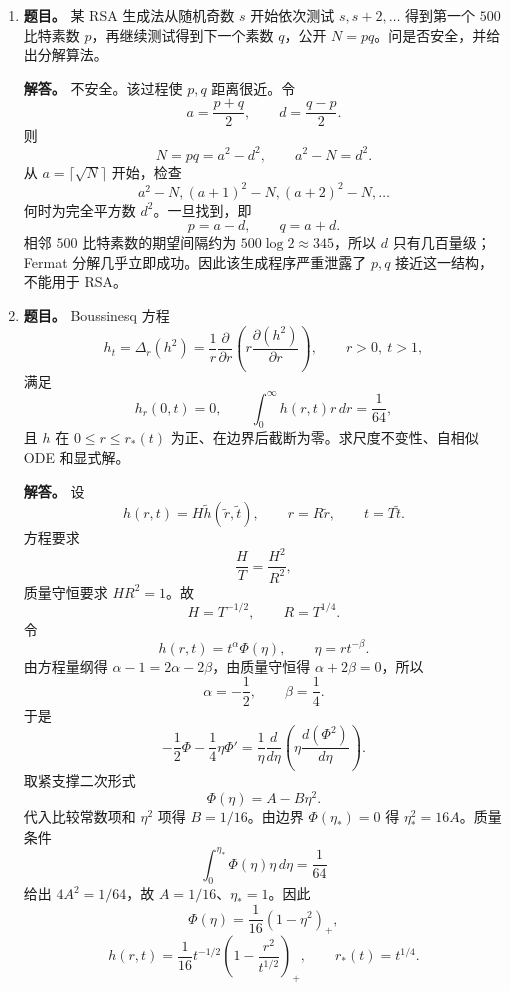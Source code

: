 ﻿\documentclass[UTF8,12pt]{ctexart}
\begin{document}
\begin{enumerate}[label=\textbf{\arabic*.},leftmargin=2.2em]
\textbf{解答。} 严格对角占优矩阵由 Levy--Desplanques 定理非奇异，故 \(Ax=b\) 有唯一解。若迭代收敛，则 \(\rho(M)<1\)，从而 \(|\det M|<1\)。由于 \(I+\alpha\Omega L\) 为单位下三角矩阵，
\[
|\det M|=\prod_{i=1}^N|1-\omega_i|,
\]
故必要条件为
\[
\prod_i|1-\omega_i|<1.
\]
设 \(\lambda\) 是 \(M\) 的特征值，取特征向量 \(x\) 中满足 \(|x_i|=\max_j|x_j|\) 的分量。由特征方程逐行估计得
\[
|\lambda|\bigl(1-|\alpha\omega_i|l_i\bigr)
\le |1-\omega_i|+|\omega_i|(|1-\alpha|l_i+u_i),
\]
其中
\[
l_i=\sum_{j<i}|a_{ij}|,\qquad u_i=\sum_{j>i}|a_{ij}|.
\]
若 \(|\alpha\omega_i|l_i<1\)，则
\[
|\lambda|\le
\frac{|1-\omega_i|+|\omega_i|(|1-\alpha|l_i+u_i)}
{1-|\alpha\omega_i|l_i}.
\]
对所有特征值取最大即得题中谱半径估计。若
\[
0<\omega_i<\frac{2}{1+l_i+u_i},
\]
并用严格对角占优给出的 \(l_i+u_i<1\)，可直接验证上式右端严格小于 \(1\)。故 \(\rho(M)<1\)，迭代收敛。

\item \textbf{题目。} 某 RSA 生成法从随机奇数 \(s\) 开始依次测试 \(s,s+2,\ldots\) 得到第一个 \(500\) 比特素数 \(p\)，再继续测试得到下一个素数 \(q\)，公开 \(N=pq\)。问是否安全，并给出分解算法。

\textbf{解答。} 不安全。该过程使 \(p,q\) 距离很近。令
\[
a=\frac{p+q}{2},\qquad d=\frac{q-p}{2}.
\]
则
\[
N=pq=a^2-d^2,\qquad a^2-N=d^2.
\]
从 \(a=\lceil\sqrt N\rceil\) 开始，检查
\[
a^2-N,(a+1)^2-N,(a+2)^2-N,\ldots
\]
何时为完全平方数 \(d^2\)。一旦找到，即
\[
p=a-d,\qquad q=a+d.
\]
相邻 \(500\) 比特素数的期望间隔约为 \(500\log2\approx345\)，所以 \(d\) 只有几百量级；Fermat 分解几乎立即成功。因此该生成程序严重泄露了 \(p,q\) 接近这一结构，不能用于 RSA。

\item \textbf{题目。} Boussinesq 方程
\[
h_t=\Delta_r(h^2)=\frac1r\frac{\partial}{\partial r}
\left(r\frac{\partial(h^2)}{\partial r}\right),
\qquad r>0,\ t>1,
\]
满足
\[
h_r(0,t)=0,\qquad \int_0^\infty h(r,t)r\,dr=\frac1{64},
\]
且 \(h\) 在 \(0\le r\le r_*(t)\) 为正、在边界后截断为零。求尺度不变性、自相似 ODE 和显式解。

\textbf{解答。} 设
\[
h(r,t)=H\widetilde h(\widetilde r,\widetilde t),\qquad
r=R\widetilde r,\qquad t=T\widetilde t.
\]
方程要求
\[
\frac{H}{T}=\frac{H^2}{R^2},
\]
质量守恒要求 \(HR^2=1\)。故
\[
H=T^{-1/2},\qquad R=T^{1/4}.
\]
令
\[
h(r,t)=t^\alpha\Phi(\eta),\qquad \eta=rt^{-\beta}.
\]
由方程量纲得 \(\alpha-1=2\alpha-2\beta\)，由质量守恒得 \(\alpha+2\beta=0\)，所以
\[
\alpha=-\frac12,\qquad \beta=\frac14.
\]
于是
\[
-\frac12\Phi-\frac14\eta\Phi'
=\frac1\eta\frac{d}{d\eta}
\left(\eta\frac{d(\Phi^2)}{d\eta}\right).
\]
取紧支撑二次形式
\[
\Phi(\eta)=A-B\eta^2.
\]
代入比较常数项和 \(\eta^2\) 项得 \(B=1/16\)。由边界 \(\Phi(\eta_*)=0\) 得 \(\eta_*^2=16A\)。质量条件
\[
\int_0^{\eta_*}\Phi(\eta)\eta\,d\eta=\frac1{64}
\]
给出 \(4A^2=1/64\)，故 \(A=1/16\)、\(\eta_*=1\)。因此
\[
\Phi(\eta)=\frac1{16}(1-\eta^2)_+,
\]
\[
h(r,t)=\frac1{16}t^{-1/2}
\left(1-\frac{r^2}{t^{1/2}}\right)_+,
\qquad r_*(t)=t^{1/4}.
\]
\end{enumerate}
\end{document}
